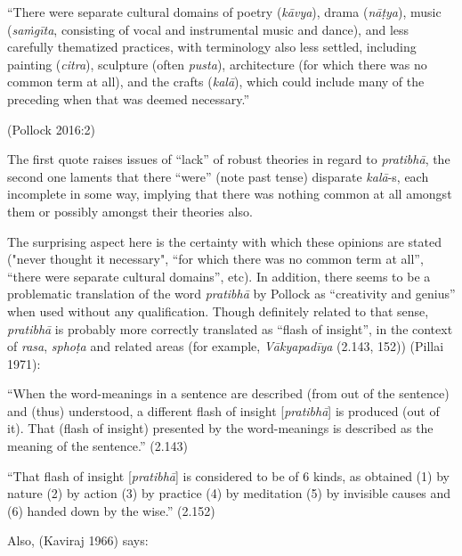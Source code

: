 \begin{myquote}
“There were separate cultural domains of poetry (\textsl{kāvya}), drama (\textsl{nāṭya}), music (\textsl{saṁgīta}, consisting of vocal and instrumental music and dance), and less carefully thematized practices, with terminology also less settled, including painting (\textsl{citra}), sculpture (often \textsl{pusta}), architecture (for which there was no common term at all), and the crafts (\textsl{kalā}), which could include many of the preceding when that was deemed necessary.” 

\hfill(Pollock 2016:2)
\end{myquote}

The first quote raises issues of “lack” of robust theories in regard to \textsl{pratibhā}, the second one laments that there “were” (note past tense) disparate \textsl{kalā}-s, each incomplete in some way, implying that there was nothing common at all amongst them or possibly amongst their theories also.

The surprising aspect here is the certainty with which these opinions are stated ("never thought it necessary", “for which there was no common term at all”, “there were separate cultural domains”, etc). In addition, there seems to be a problematic translation of the word \textsl{pratibhā} by Pollock as “creativity and genius” when used without any qualification. Though definitely related to that sense, \textsl{pratibhā} is probably more correctly translated as “flash of insight”, in the context of \textsl{rasa}, \textsl{sphoṭa} and related areas (for example, \textsl{Vākyapadīya} (2.143, 152)) (Pillai 1971):

“When the word-meanings in a sentence are described (from out of the sentence) and (thus) understood, a different flash of insight [\textsl{pratibhā}] is produced (out of it). That (flash of insight) presented by the word-meanings is described as the meaning of the sentence.” (2.143)

“That flash of insight [\textsl{pratibhā}] is considered to be of 6 kinds, as obtained (1) by nature (2) by action (3) by practice (4) by meditation (5) by invisible causes and (6) handed down by the wise.” (2.152)

Also, (Kaviraj 1966) says:

